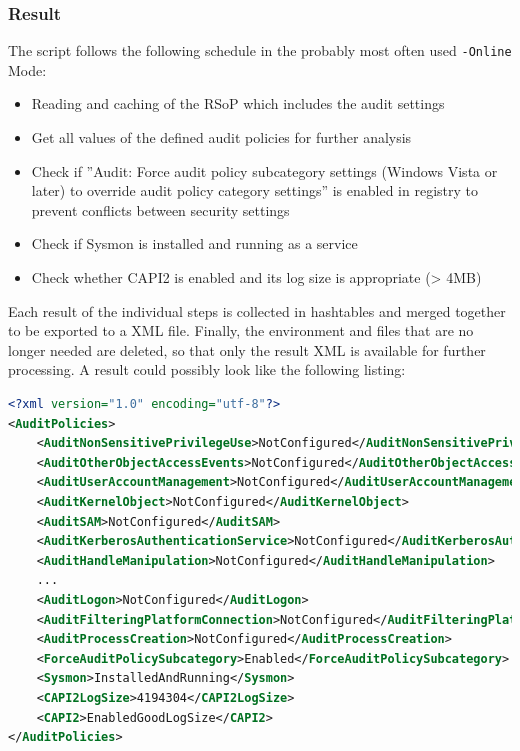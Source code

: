 \subsubsection{Result}\label{GetAndAnalyseAuditPoliciesResult}
The script follows the following schedule in the probably most often used \lstinline|-Online| Mode:
\begin{itemize}
    \item Reading and caching of the RSoP which includes the audit settings
    \item Get all values of the defined audit policies for further analysis
    \item Check if ''Audit: Force audit policy subcategory settings (Windows Vista or later) to override audit policy category settings'' is enabled in registry to prevent conflicts between security settings
    \item Check if Sysmon is installed and running as a service
    \item Check whether CAPI2 is enabled and its log size is appropriate (> 4MB)
\end{itemize}
Each result of the individual steps is collected in hashtables and merged together to be exported to a XML file. Finally, the environment and files that are no longer needed are deleted, so that only the result XML is available for further processing. A result could possibly look like the following listing:
\begin{lstlisting}[caption=Example Result Audit Policy Analysis, language=xml]
<?xml version="1.0" encoding="utf-8"?>
<AuditPolicies>
    <AuditNonSensitivePrivilegeUse>NotConfigured</AuditNonSensitivePrivilegeUse>
    <AuditOtherObjectAccessEvents>NotConfigured</AuditOtherObjectAccessEvents>
    <AuditUserAccountManagement>NotConfigured</AuditUserAccountManagement>
    <AuditKernelObject>NotConfigured</AuditKernelObject>
    <AuditSAM>NotConfigured</AuditSAM>
    <AuditKerberosAuthenticationService>NotConfigured</AuditKerberosAuthenticationService>
    <AuditHandleManipulation>NotConfigured</AuditHandleManipulation>
    ...    
    <AuditLogon>NotConfigured</AuditLogon>
    <AuditFilteringPlatformConnection>NotConfigured</AuditFilteringPlatformConnection>
    <AuditProcessCreation>NotConfigured</AuditProcessCreation>
    <ForceAuditPolicySubcategory>Enabled</ForceAuditPolicySubcategory>
    <Sysmon>InstalledAndRunning</Sysmon>
    <CAPI2LogSize>4194304</CAPI2LogSize>
    <CAPI2>EnabledGoodLogSize</CAPI2>
</AuditPolicies>
\end{lstlisting}


